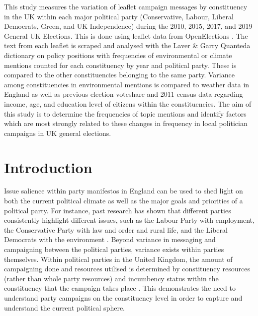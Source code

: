 \documentclass[12pt,letterpaper]{article}
\begin{document}
	This study measures the variation of leaflet campaign messages by constituency in the UK within each major political party (Conservative, Labour, Liberal Democrats, Green, and UK Independence) during the 2010, 2015, 2017, and 2019 General UK Elections. This is done using leaflet data from OpenElections \autocite{milazzo2020openelections}. The text from each leaflet is scraped and analysed with the Laver \& Garry Quanteda dictionary \autocite{laverEstimatingPolicyPositions2000} on policy positions with frequencies of environmental or climate mentions counted for each constituency by year and political party. These is compared to the other constituencies belonging to the same party. Variance among constituencies in environmental mentions is compared to weather data in England as well as previous election voteshare and 2011 census data regarding income, age, and education level of citizens within the constituencies. The aim of this study is to determine the frequencies of topic mentions and identify factors which are most strongly related to these changes in frequency in local politician campaigns in UK general elections.
	
	\newpage
	
	\section{Introduction}
	
Issue salience within party manifestos in England can be used to shed light on both the current political climate as well as the major goals and priorities of a political party. For instance, past research has shown that different parties consistently highlight different issues, such as the Labour Party with employment, the Conservative Party with law and order and rural life, and the Liberal Democrats with the environment \autocite{pogorelisIssueSalienceRegional2005}. Beyond variance in messaging and campaigning between the political parties, variance exists within parties themselves. Within political parties in the United Kingdom, the amount of campaigning done and resources utilised is determined by constituency resources (rather than whole party resources) and incumbency status within the constituency that the campaign takes place \autocite{pattieIncumbentPartiesIncumbent2017a}. This demonstrates the need to understand party campaigns on the constituency level in order to capture and understand the current political sphere.
\end{document}
